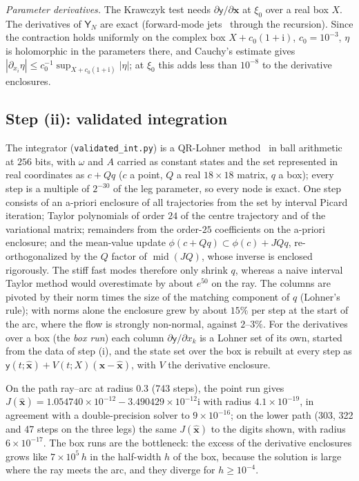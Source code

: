 \documentclass{amsart}
\numberwithin{equation}{section}
\theoremstyle{plain}
\theoremstyle{definition}
\theoremstyle{remark}
\newcommand{\bx}{\mathbf{x}}
\newcommand{\hx}{\hat{\mathbf{x}}}
\newcommand{\iu}{\mathrm{i}}
\newcommand{\repo}[1]{\texttt{#1}}
\begin{document}
\emph{Parameter derivatives.} The Krawczyk test needs $\partial\mathsf y/\partial\bx$ at $\xi_0$ over a real box $X$. The derivatives of
$\mathsf Y_N$ are exact (forward-mode jets~\cite{Wengert1964} through the recursion). Since the contraction holds uniformly on the complex box
$X + c_0(1+\iu)$, $c_0 = 10^{-3}$, $\eta$ is holomorphic in the parameters there, and Cauchy's estimate gives
$|\partial_{x_i}\eta| \le c_0^{-1}\sup_{X + c_0(1+\iu)}|\eta|$; at $\xi_0$ this adds less than $10^{-8}$ to the derivative enclosures.

\subsection{Step (ii): validated integration}
The integrator (\repo{validated\_int.py}) is a QR-Lohner method~\cite{Lohner1987,NedialkovJackson2001} in ball arithmetic at
$256$ bits, with $\omega$ and $A$ carried as constant states and the set represented in real coordinates as $c + Qq$ ($c$ a point,
$Q$ a real $18\times18$ matrix, $q$ a box); every step is a multiple of $2^{-30}$ of the leg parameter, so every node is exact. One
step consists of an a-priori enclosure of all trajectories from the set by interval Picard iteration; Taylor polynomials of
order $24$ of the centre trajectory and of the variational matrix; remainders from the order-$25$ coefficients on the a-priori
enclosure; and the mean-value update $\phi(c + Qq) \subset \phi(c) + JQq$, re-orthogonalized by the $Q$ factor of
$\operatorname{mid}(JQ)$, whose inverse is enclosed rigorously. The stiff fast modes therefore only shrink $q$, whereas a naive
interval Taylor method would overestimate by about $e^{50}$ on the ray. The columns are pivoted by their norm times the size of the
matching component of $q$ (Lohner's rule); with norms alone the enclosure grew by about $15\%$ per step at the start of the arc,
where the flow is strongly non-normal, against $2$--$3\%$. For the derivatives over a box (the \emph{box run}) each column
$\partial\mathsf y/\partial x_k$ is a Lohner set of its own, started from the data of step (i), and the state set over the box is rebuilt at
every step as $\mathsf y(t;\hx) + V(t;X)(\bx - \hx)$, with $V$ the derivative enclosure.

On the path ray--arc at radius $0.3$ (743 steps), the point run gives $J(\hx) = 1.054740\times10^{-12} - 3.490429\times10^{-12}\iu$ with
radius $4.1\times10^{-19}$, in agreement with a double-precision solver to $9\times10^{-16}$; on the lower path (303, 322 and 47
steps on the three legs) the same $J(\hx)$ to the digits shown, with radius $6\times10^{-17}$. The box runs are the
bottleneck: the excess of the derivative enclosures grows like $7\times10^5\,h$ in the half-width $h$ of the box, because the
solution is large where the ray meets the arc, and they diverge for $h \ge 10^{-4}$.
\end{document}
